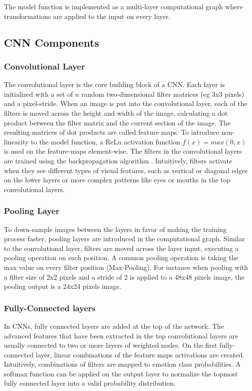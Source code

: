\documentclass[twoside]{article}
\begin{document}
\begin{multicols}{2}
The model function is implemented as a multi-layer computational graph where transformations are applied to the input on every layer.


\subsection{CNN Components}

\subsubsection{Convolutional Layer}
The convolutional layer is the core building block of a CNN. Each layer is initialized with a set of $n$ random two-dimensional filter matrices (eg 3x3 pixels) and a pixel-stride. When an image is put into the convolutional layer, each of the filters is moved across the height and width of the image, calculating a dot product between the filter matrix and the current section of the image. The resulting matrices of dot products are called feature maps. \cite{karpathy} To introduce non-linearity to the model function, a ReLu activation function $f(x) = max(0, x)$ is used on the feature-maps element-wise. The filters in the convolutional layers are trained using the backpropagation algorithm \cite{goodfel16}. Intuitively, filters activate when they see different types of visual features, such as vertical or diagonal edges on the lower layers or more complex patterns like eyes or mouths in the top convolutional layers.

\subsubsection{Pooling Layer}
To down-sample images between the layers in favor of making the training process faster, pooling layers are introduced in the computational graph. Similar to the convolutional layer, filters are moved across the layer input, executing a pooling operation on each position. A common pooling operation is taking the max value on every filter position (Max-Pooling). For instance when pooling with a filter size of 2x2 pixels and a stride of 2 is applied to a 48x48 pixels image, the pooling output is a 24x24 pixels image.

\subsubsection{Fully-Connected layers}
In CNNs, fully connected layers are added at the top of the network. The advanced features that have been extracted in the top convolutional layers are usually connected to two or more layers of weighted nodes. On the first fully-connected layer, linear combinations of the feature maps activations are created. Intuitively, combinations of filters are mapped to emotion class probabilities. A softmax function can be applied on the output layer to normalize the topmost fully connected layer into a valid probability distribution.



\end{multicols}
\end{document}
